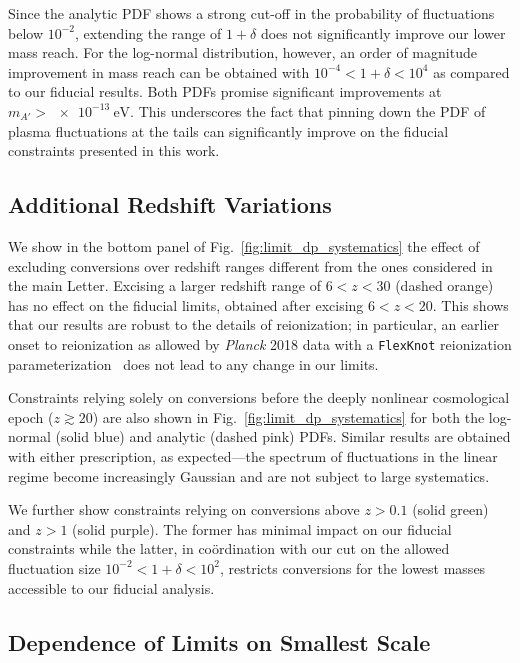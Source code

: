 \documentclass[prd,aps,10pt,nofootinbib,twocolumn,superscriptaddress,preprintnumbers,balancelastpage,longbibliography]{revtex4-1}
\begin{document}
Since the analytic PDF shows a strong cut-off in the probability of fluctuations below $10^{-2}$, extending the range of $1+\delta$ does not significantly improve our lower mass reach. For the log-normal distribution, however, an order of magnitude improvement in mass reach can be obtained with $10^{-4} < 1+\delta < 10^4$ as compared to our fiducial results. Both PDFs promise significant improvements at $m_{A'} > \SI{e-13}{\eV}$. This underscores the fact that pinning down the PDF of plasma fluctuations at the tails can significantly improve on the fiducial constraints presented in this work.

\subsection{Additional Redshift Variations}

We show in the bottom panel of Fig.~\ref{fig:limit_dp_systematics} the effect of excluding conversions over redshift ranges different from the ones considered in the main Letter. Excising a larger redshift range of $6 < z < 30$ (dashed orange) has no effect on the fiducial limits, obtained after excising $6 < z < 20$. This shows that our results are robust to the details of reionization; in particular, an earlier onset to reionization as allowed by \emph{Planck} 2018 data with a \texttt{FlexKnot} reionization parameterization~\cite{Aghanim:2018eyx} does not lead to any change in our limits.

Constraints relying solely on conversions before the deeply nonlinear cosmological epoch ($z \gtrsim 20$)  are also shown in Fig.~\ref{fig:limit_dp_systematics} for both the log-normal (solid blue) and analytic (dashed pink) PDFs. Similar results are obtained with either prescription, as expected---the spectrum of fluctuations in the linear regime become increasingly Gaussian and are not subject to large systematics.

We further show constraints relying on conversions above $z > 0.1$ (solid green) and $z > 1$ (solid purple). The former has minimal impact on our fiducial constraints while the latter, in co\"ordination with our cut on the allowed fluctuation size $10^{-2} < 1 + \delta < 10^2$, restricts conversions for the lowest masses accessible to our fiducial analysis.

\subsection{Dependence of Limits on Smallest Scale}
\end{document}
